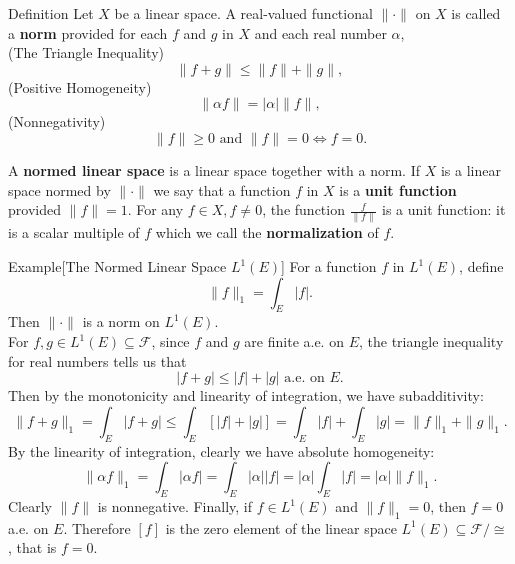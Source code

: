 \begin{flushleft}
	\begin{namedthm*}{Definition}
		Let $X$ be a linear space.
		A real-valued functional $\|\cdot\|$  on $X$ is called a \textbf{norm} provided for each $f$ and $g$ in $X$ and each real number $\alpha$,\\
		(The Triangle Inequality)
		\[
			\|f+g\|\le\|f\|+\|g\|,
		\]
		(Positive Homogeneity)
		\[
			\|\alpha f\|=|\alpha|\|f\|,	
		\]
		(Nonnegativity)
		\[
			\|f\|\ge 0\text{ and }\|f\|=0 \iff f=0.
		\]
	\end{namedthm*}
	A \textbf{normed linear space} is a linear space together with a norm.
	If $X$ is a linear space normed by $\|\cdot\|$ we say that a function $f$ in $X$ is a \textbf{unit function} provided $\|f\|=1$.
	For any $f\in X,f\neq 0$, the function $\frac{f}{\|f\|}$ is a unit function: it is a scalar multiple of $f$ which we call the \textbf{normalization} of $f$.

	\begin{namedthm*}{Example}[The Normed Linear Space $L^1(E)$]
		For a function $f$ in $L^1(E)$, define
		\[
		\|f\|_1=\int_E|f|.	
		\]
		Then $\|\cdot\|$ is a norm on $L^1(E)$.\\
		For $f,g\in L^1(E)\subseteq \mathcal{F}$, since $f$ and $g$ are finite a.e. on $E$, the triangle inequality for real numbers tells us that
		\[
		|f+g|\le|f|+|g|\text{ a.e. on }E.	
		\]
		Then by the monotonicity and linearity of integration, we have subadditivity:
		\[
			\|f+g\|_1=\int_E|f+g| \le \int_E[|f|+|g|] = \int_E|f| +\int_E|g| = \|f\|_1+\|g\|_1.	
		\]
		By the linearity of integration, clearly we have absolute homogeneity:
		\[
			\|\alpha f\|_1 = \int_E|\alpha f| = \int_E|\alpha| |f|=|\alpha|\int_E| f| = |\alpha|\|f\|_1.	
		\]
		Clearly $\|f\|$ is nonnegative. Finally, if $f\in L^1(E)$ and $\|f\|_1=0$, then $f=0$ a.e. on $E$. 
		Therefore $[f]$ is the zero element of the linear space $L^1(E)\subseteq \mathcal{F}/\cong$, that is $f=0$.
	\end{namedthm*}


\end{flushleft}
